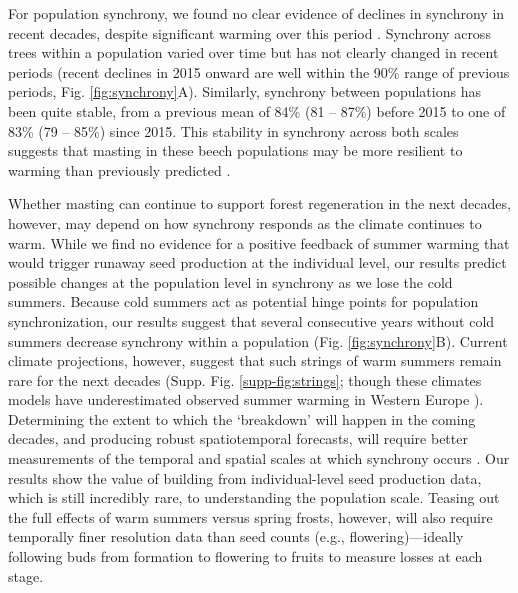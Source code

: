 \documentclass[11pt]{article}
\begin{document}
For population synchrony, we found no clear evidence of declines in synchrony in recent decades, despite significant warming over this period \citep{Bogdziewicz2020, Foest2024}. Synchrony across trees within a population varied over time but has not clearly changed in recent periods (recent declines in 2015 onward are well within the 90\% range of previous periods, Fig. \ref{fig:synchrony}A). 
Similarly, synchrony between populations has been quite stable, from a previous mean of 84\%  (81 -- 87\%) before 2015 to one of 83\%  (79 -- 85\%) since 2015. 
This stability in synchrony across both scales suggests that masting in these beech populations may be more resilient to warming than previously predicted \citep{Bogdziewicz2021}.

Whether masting can continue to support forest regeneration in the next decades, however, may depend on how synchrony responds as the climate continues to warm.
While we find no evidence for a positive feedback of summer warming that would trigger runaway seed production at the individual level, our results predict possible changes at the population level in synchrony as we lose the cold summers. Because cold summers act as potential hinge points for population synchronization, our results suggest that several consecutive years without cold summers decrease synchrony within a population (Fig. \ref{fig:synchrony}B). Current climate projections, however, suggest that such strings of warm summers remain rare for the next decades (Supp. Fig. \ref{supp-fig:strings}; though these climates models have underestimated observed summer warming in Western Europe \citep{Schumacher2024}). Determining the extent to which the `breakdown' will happen in the coming decades, and producing robust spatiotemporal forecasts, will require better measurements of the temporal and spatial scales at which synchrony occurs \citep{LaMontagne2020}. Our results show the value of building from individual-level seed production data, which is still incredibly rare, to understanding the population scale. Teasing out the full effects of warm summers versus spring frosts, however, will also require temporally finer resolution data than seed counts (e.g., flowering\citep{Nussbaumer2020})---ideally following buds from formation to flowering to fruits to measure losses at each stage. 
\end{document}
